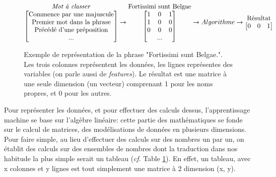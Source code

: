 \begin{figure}
    \centering
    \begin{equation*}
        \begin{matrix}
            \textrm{\textit{Mot à classer}} \\
            \begin{bmatrix}
            \textrm{Commence par une majuscule} \\
            \textrm{Premier mot dans la phrase} \\
            \textrm{Précédé d'une préposition} \\
            \textrm{...} \\
            \end{bmatrix}
        \end{matrix}
        \rightarrow
        \begin{matrix}
            \textrm{Fortissimi sunt Belgae} \\
            \begin{bmatrix}
            1 & 0 & 1 \\
            1 & 0 & 0 \\
            0 & 0 & 0 \\
            & \textrm{...} & \\
            \end{bmatrix}
        \end{matrix}
        \rightarrow Algorithme \rightarrow
        \begin{matrix}
            \textrm{Résultat} \\
            \begin{bmatrix}
            0 & 0 & 1 \\
            \end{bmatrix}
        \end{matrix}
        \end{equation*}
    \caption{Exemple de représentation de la phrase "Fortissimi sunt Belgae.". Les trois colonnes représentent les données, les lignes représentes des variables (on parle aussi de \textit{features}). Le résultat est une matrice à une seule dimension (un vecteur) comprenant 1 pour les noms propres, et 0 pour les autres.}
    \label{fig:deep-learning:matrice}
\end{figure}

Pour représenter les données, et pour effectuer des calculs dessus, l'apprentissage machine se base sur l'algèbre linéaire: cette partie des mathématiques se fonde sur le calcul de matrices, des modélisations de données en plusieurs dimensions. Pour faire simple, au lieu d'effectuer des calculs sur des nombres un par un, on établit des calculs sur des ensembles de nombres dont la traduction dans nos habitude la plus simple serait un tableau (\textit{cf.} Table \ref{fig:deep-learning:matrice}). En effet, un tableau, avec x colonnes et y lignes est tout simplement une matrice à 2 dimension (x, y). 

